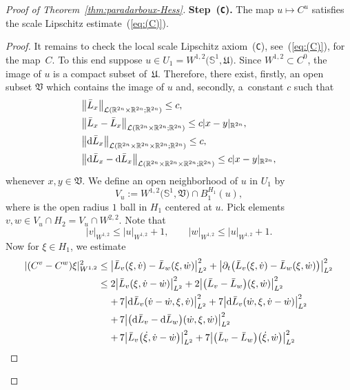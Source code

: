 \documentclass[pdftex]{sigma}
\numberwithin{equation}{section}
\newcommand{\R}{{\mathbb{R}}}
\renewcommand{\SS}{{\mathbb{S}}}
\newcommand{\Ll}{{\mathcal{L}}} %
\def\abs#1{\mathopen|#1\mathclose|}
\newcommand{\p}{{\partial}}
\newcommand{\1}{{{\mathchoice {\rm 1\mskip-4mu l} {\rm 1\mskip-4mu l}
{\rm 1\mskip-4.5mu l} {\rm 1\mskip-5mu l}}}}
\begin{document}
\begin{proof}[Proof of Theorem~\ref{thm:paradarboux-Hess}]
\noindent
\textbf{Step~(\texttt{C}).} The map $u\mapsto C^u$ satisfies the scale
Lipschitz estimate~(\ref{eq:(C)}).


\begin{proof}
It remains to check the local scale Lipschitz axiom~(\texttt{C}),
see~(\ref{eq:(C)}), for the map~$C$.
To this end suppose $u\in U_1=W^{1,2}\bigl(\SS^1,\mathfrak{U}\bigr)$.
Since $W^{1,2}\subset C^0$, the image of $u$ is a compact subset
of~$\mathfrak{U}$. Therefore, there exist, firstly, an open subset
$\mathfrak{V}$ which contains the image of $u$ and, secondly, a~constant $c$ such that
\begin{align}
 &\bigl\|\bar L_x\bigr\|_{\Ll(\R^{2n}\times\R^{2n};\R^{2n})}
\le c, \nonumber
\\
 &\bigl\|\bar L_x-\bar L_x\bigr\|_{\Ll(\R^{2n}\times\R^{2n};\R^{2n})}
\le c \abs{x-y}_{\R^{2n}}, \nonumber
\\
 &\bigl\| {\rm d}\bar L_x\bigr\|_{\Ll(\R^{2n}\times\R^{2n}\times\R^{2n};\R^{2n})}
\le c ,\nonumber
\\
 &\bigl\|{\rm d}\bar L_x-{\rm d}\bar L_x\bigr\|_{\Ll(\R^{2n}\times\R^{2n}\times\R^{2n};\R^{2n})}
\le c \abs{x-y}_{\R^{2n}},\label{eq:L-est}
\end{align}
whenever $x,y\in\mathfrak{V}$.
We define an open neighborhood of $u$ in $U_1$ by
\[
 V_u:=W^{1,2}\bigl(\SS^1,\mathfrak{V}\bigr)
 \cap B_1^{H_1}(u),
\]
where  is the open radius $1$ ball in $H_1$ centered at $u$.
Pick elements $v,w\in V_u\cap H_2 =V_u\cap W^{2,2}$.
Note that
\[
 \abs{v}_{W^{1,2}}\le \abs{u}_{W^{1,2}}+1
 ,\qquad
 \abs{w}_{W^{1,2}}\le \abs{u}_{W^{1,2}}+1 .
\]
Now for $\xi\in H_1$, we estimate
\begin{equation*}
\begin{split}
 \abs{(C^v-C^w)\xi}_{W^{1,2}}^2
 \le{}& \bigl|\bar L_v(\xi,\dot v)-\bar L_w(\xi,\dot w)\bigr|_{L^2}^2
 +\bigl|\p_t\bigl(\bar L_v(\xi,\dot v)-\bar L_w(\xi,\dot w)\bigr)\bigr|_{L^2}^2
\\
 \le{}& 2\bigl|\bar L_v(\xi,\dot v-\dot w)\bigr|_{L^2}^2
 +2\bigl|\bigl(\bar L_v-\bar L_w\bigr) (\xi,\dot w)\bigr|_{L^2}^2
 \\
 &{+}\,7\bigl|{\rm d}\bar L_v(\dot v-\dot w,\xi,\dot v)\bigr|_{L^2}^2
 +7\bigl|{\rm d}\bar L_v(\dot w,\xi,\dot v-\dot w)\bigr|_{L^2}^2
 \\
 &{+}\,7\bigl|\bigl({\rm d}\bar L_v-{\rm d}\bar L_w\bigr)(\dot w,\xi,\dot w)\bigr|_{L^2}^2
 \\
 &{+}\,7\bigl|\bar L_v\bigl(\dot \xi,\dot v-\dot w\bigr)\bigr|_{L^2}^2
 +7\bigl|\bigl(\bar L_v-\bar L_w\bigr)\bigl(\dot \xi,\dot w\bigr)\bigr|_{L^2}^2

\end{split}
\end{equation*}
\end{proof}
\end{proof}
\end{document}
